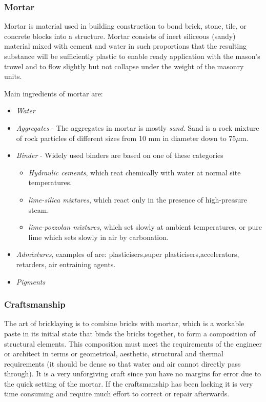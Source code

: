 \subsubsection{Mortar}

Mortar is  material used in building construction to bond brick, stone, tile, or concrete blocks into a structure. Mortar consists of inert siliceous (sandy) material mixed with cement and water in such proportions that the resulting substance will be sufficiently plastic to enable ready application with the mason’s trowel and to flow slightly but not collapse under the weight of the masonry units.\cite{ref:mortar}

Main ingredients of mortar are:
\begin{itemize}
\item \textit{Water}
\item \textit{Aggregates} - The aggregates in mortar is mostly \textit{sand}. Sand is a rock mixture of rock particles of different sizes from 10 mm in diameter down to 75$\mu$m. 
\item \textit{Binder} - Widely used binders are based on one of these categories
    \begin{itemize}
    \item \textit{Hydraulic cements}, which reat chemically with water at normal site temperatures.
    \item \textit{lime-silica mixtures}, which react only in the presence of high-pressure steam.
    \item \textit{lime-pozzolan mixtures}, which set slowly at ambient temperatures, or pure lime which sets slowly in air by carbonation.
    \end{itemize}
\item \textit{Admixtures}, examples of are: plasticisers,super plasticisers,accelerators, retarders, air entraining agents. 
\item \textit{Pigments}
\end{itemize}





\subsubsection{Craftsmanship}

The art of bricklaying is to combine  bricks with mortar, which is a workable paste in its initial state that binds the bricks together, to form a composition of structural elements. This composition must meet the requirements of the engineer or architect in terms or geometrical, aesthetic, structural and thermal requirements (it should be dense so that water and air cannot directly pass through). It is a very unforgiving craft since you have no margins for error due to the quick setting of the mortar. If the craftsmanship has been lacking it is very time consuming and require much effort to correct or repair afterwards. 

